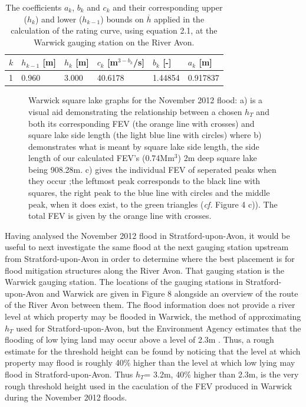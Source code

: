 \documentclass[11pt,a4paper]{article}
\begin{document}
\begin{table}[ht!]
\centering
\begin{tabular}{l|l|l|l|l|l}
$k$ & $h_{k-1}$ [m] & $h_k$ [m] & $c_k$ [m$^{3-b_k}$/s] & $b_k$ [-] & $a_k$ [m]\\
\hline
1 & 0.960 & 3.000 & 40.6178 & 1.44854 & 0.917837 \\
\end{tabular}
\caption{The coefficients $a_k$, $b_k$ and $c_k$ and their corresponding upper ($h_k$) and lower ($h_{k-1}$) bounds on $\overline{h}$ \cite{EA} applied in the calculation of the rating curve, using equation 2.1, at the Warwick gauging station on the River Avon.}
\end{table}

\begin{figure}[ht!]
\centering
{}
\hfill
{}
\caption{Warwick square lake graphs for the November 2012 flood: a) is a visual aid demonstrating the relationship between a chosen $h_T$ and both its corresponding FEV (the orange line with crosses) and square lake side length (the light blue line with circles) where b) demonstrates what is meant by square lake side length, the side length of our calculated FEV's (0.74Mm$^3$) 2m deep square lake being 908.28m. c) gives the individual FEV of seperated peaks when they occur {;}the leftmost peak corresponds to the black line with squares, the right peak to the blue line with circles and the middle peak, when it does exist, to the green triangles (\textit{cf.} Figure 4 c)). The total FEV is given by the orange line with crosses.}
\end{figure}

\noindent Having analysed the November 2012 flood in Stratford-upon-Avon, it would be useful to next investigate the same flood at the next gauging station upstream from Stratford-upon-Avon in order to determine where the best placement is for flood mitigation structures along the River Avon. That gauging station is the Warwick gauging station. The locations of the gauging stations in Stratford-upon-Avon and Warwick are given in Figure 8 alongside an overview of the route of the River Avon between them. The flood information does not provide a river level at which property may be flooded in Warwick, the method of approximating $h_T$ used for Stratford-upon-Avon, but the Environment Agency estimates that the flooding of low lying land may occur above a level of 2.3m \cite{EA}. Thus, a rough estimate for the threshold height can be found by noticing that the level at which property may flood is roughly 40\% higher than the level at which low lying may flood in Stratford-upon-Avon. Thus $h_T$= 3.2m, 40\% higher than 2.3m, is the very rough threshold height used in the caculation of the FEV produced in Warwick during the November 2012 floods.
\end{document}
